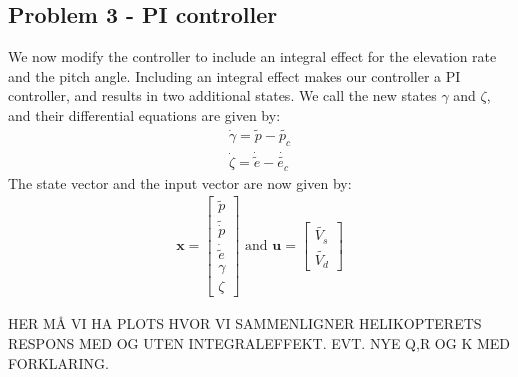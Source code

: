 \subsection{Problem 3 - PI controller}
We now modify the controller to include an integral effect for the elevation rate and the pitch angle. Including an integral effect makes our controller a PI controller, and results in two additional states. We call the new states $\gamma$ and $\zeta$, and their differential equations are given by:
\begin{gather*}
    \dot{\gamma} = \tilde{p} - \tilde{p_c}\\
    \dot{\zeta} = \dot{\tilde{e}} - \dot{\tilde{e_c}}
\end{gather*}
The state vector and the input vector are now given by:
\begin{gather*}
    \mathbf{x} = \begin{bmatrix}
    \tilde{p} \\ \tilde{\dot{p}} \\
    \dot{\tilde{e}} \\ \gamma \\ \zeta \end{bmatrix}
    \text{ and } \mathbf{u} = \begin{bmatrix}
    \tilde{V_s} \\ \tilde{V_d} \end{bmatrix}
\end{gather*}

HER MÅ VI HA PLOTS HVOR VI SAMMENLIGNER HELIKOPTERETS RESPONS MED OG UTEN INTEGRALEFFEKT. EVT. NYE Q,R OG K MED FORKLARING. 









